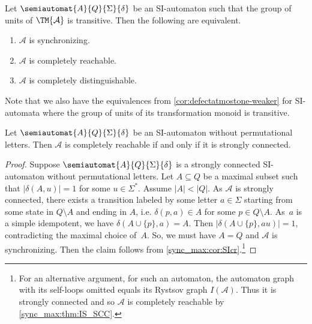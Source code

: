 \begin{corollary} \label{syncmax:cor:SI-transitive-grp-of-units}
	Let $\semiautomat{A}{Q}{\Sigma}{\delta}$
	be an SI-automaton such that the group of units of $\TM{\mathcal A}$ is transitive.
	Then the following are equivalent.
	
	\begin{enumerate}
		\item $\mathcal A$ is synchronizing.
		
		\item $\mathcal A$ is completely reachable.
		
		\item $\mathcal A$ is completely distinguishable.
		\end{enumerate}
\end{corollary}

Note that we also have the equivalences from \cref{cor:defectatmostone-weaker} for SI-automata
where the group of units of its transformation monoid is transitive.

\begin{corollary}
	\label{cor:SI_CR}
	Let $\semiautomat{A}{Q}{\Sigma}{\delta}$ be an SI-automaton without permutational letters.
	Then $\mathcal A$ is completely reachable
	if and only if it is strongly connected.
\end{corollary}
\begin{proof}
	Suppose $\semiautomat{A}{Q}{\Sigma}{\delta}$ is a strongly connected
	SI-automaton without permutational letters.	
	Let $A \subseteq Q$ be a maximal subset such that $|\delta(A, u)| = 1$
	for some $u \in \Sigma^*$.
	Assume $|A| < |Q|$.
	As $\mathcal A$ is strongly connected,
	there exists a transition labeled by some letter $a \in \Sigma$
	starting from some state in $Q \setminus A$
	and ending in $A$, i.e. $\delta(p, a) \in A$
	for some $p \in Q \setminus A$.
	As~$a$ is a simple idempotent,
	we have $\delta(A \cup \{p\}, a) = A$.
	Then $|\delta(A \cup \{p\}, au)| = 1$, contradicting
	the maximal choice of~$A$.
	So, we must have $A = Q$ and $\mathcal A$
	is synchronizing.		
	Then the claim follows from \cref{sync_max:cor:SIcr}.\footnote{For an alternative argument,
	for such an automaton, the automaton graph with its self-loops omitted
	equals its Rystsov graph $I(\mathcal A)$. Thus it is strongly connected
	and so $\mathcal A$ is completely reachable by \cref{sync_max:thm:IS_SCC}.}
\end{proof}

